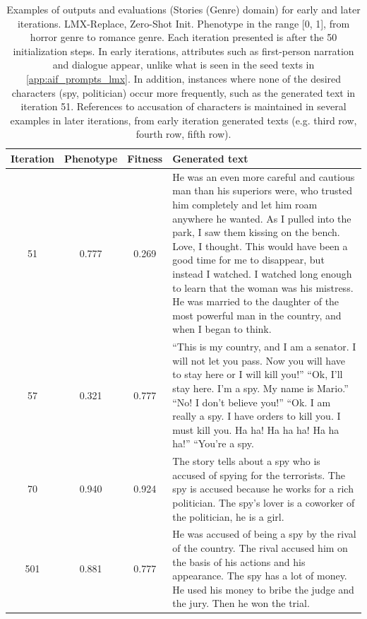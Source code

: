 \begin{table}[ht]
  \caption{Examples of outputs and evaluations (Stories (Genre) domain) for early and later iterations. LMX-Replace, Zero-Shot Init. Phenotype in the range [0, 1], from horror genre to romance genre. Each iteration presented is after the 50 initialization steps. In early iterations, attributes such as first-person narration and dialogue appear, unlike what is seen in the seed texts in \ref{app:aif_prompts_lmx}. In addition, instances where none of the desired characters (spy, politician) occur more frequently, such as the generated text in iteration 51. References to accusation of characters is maintained in several examples in later iterations, from early iteration generated texts (e.g. third row, fourth row, fifth row).}
  \begin{center}
  \small
  \begin{tabular}{cccp{8.5cm}}
    \toprule
    Iteration     & Phenotype  & Fitness     & Generated text \\
    \midrule
    51 &  0.777 & 0.269 &  He was an even more careful and cautious man than his superiors were, who trusted him completely and let him roam anywhere he wanted. As I pulled into the park, I saw them kissing on the bench. Love, I thought. This would have been a good time for me to disappear, but instead I watched. I watched long enough to learn that the woman was his mistress. He was married to the daughter of the most powerful man in the country, and when I began to think. \\
    \midrule
    57 & 0.321 & 0.777 &  \textquotedblleft{}This is my country, and I am a senator. I will not let you pass. Now you will have to stay here or I will kill you!\textquotedblright{} \textquotedblleft{}Ok, I'll stay here. I'm a spy. My name is Mario.\textquotedblright{} \textquotedblleft{}No! I don't believe you!\textquotedblright{} \textquotedblleft{}Ok. I am really a spy. I have orders to kill you. I must kill you. Ha ha! Ha ha ha! Ha ha ha!\textquotedblright{} \textquotedblleft{}You're a spy. \\
    \midrule
    70 & 0.940 & 0.924 &  The story tells about a spy who is accused of spying for the terrorists. The spy is accused because he works for a rich politician. The spy’s lover is a coworker of the politician, he is a girl. \\
    \midrule
    \midrule
    501 &  0.881 & 0.777 & He was accused of being a spy by the rival of the country. The rival accused him on the basis of his actions and his appearance. The spy has a lot of money. He used his money to bribe the judge and the jury. Then he won the trial. \\

\end{tabular}
\end{center}
\end{table}
